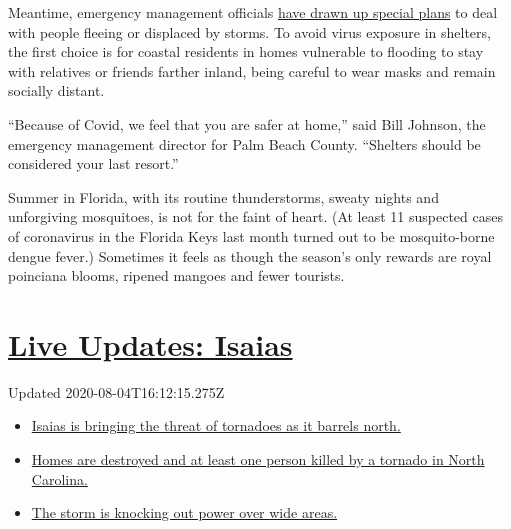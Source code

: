Meantime, emergency management officials
\href{https://www.nytimes.com/2020/05/24/us/hurricane-pandemic-coronavirus-florida.html}{have
drawn up special plans} to deal with people fleeing or displaced by
storms. To avoid virus exposure in shelters, the first choice is for
coastal residents in homes vulnerable to flooding to stay with relatives
or friends farther inland, being careful to wear masks and remain
socially distant.

``Because of Covid, we feel that you are safer at home,'' said Bill
Johnson, the emergency management director for Palm Beach County.
``Shelters should be considered your last resort.''

Summer in Florida, with its routine thunderstorms, sweaty nights and
unforgiving mosquitoes, is not for the faint of heart. (At least 11
suspected cases of coronavirus in the Florida Keys last month turned out
to be mosquito-borne dengue fever.) Sometimes it feels as though the
season's only rewards are royal poinciana blooms, ripened mangoes and
fewer tourists.

\hypertarget{live-updates-isaias}{%
\section{\texorpdfstring{\href{https://www.nytimes.com/2020/08/04/us/isaias-storm-updates.html?action=click\&pgtype=Article\&state=default\&region=MAIN_CONTENT_1\&context=storylines_live_updates}{Live
Updates: Isaias}}{Live Updates: Isaias}}\label{live-updates-isaias}}

Updated 2020-08-04T16:12:15.275Z

\begin{itemize}
\tightlist
\item
  \href{https://www.nytimes.com/2020/08/04/us/isaias-storm-updates.html?action=click\&pgtype=Article\&state=default\&region=MAIN_CONTENT_1\&context=storylines_live_updates\#link-362830dd}{Isaias
  is bringing the threat of tornadoes as it barrels north.}
\item
  \href{https://www.nytimes.com/2020/08/04/us/isaias-storm-updates.html?action=click\&pgtype=Article\&state=default\&region=MAIN_CONTENT_1\&context=storylines_live_updates\#link-48235bf8}{Homes
  are destroyed and at least one person killed by a tornado in North
  Carolina.}
\item
  \href{https://www.nytimes.com/2020/08/04/us/isaias-storm-updates.html?action=click\&pgtype=Article\&state=default\&region=MAIN_CONTENT_1\&context=storylines_live_updates\#link-34e5d4e4}{The
  storm is knocking out power over wide areas.}
\end{itemize}

